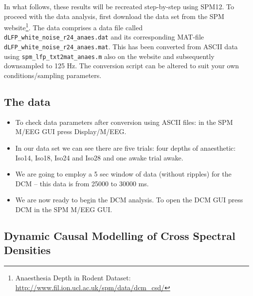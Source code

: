 In what follows, these results will be recreated step-by-step using SPM12.
To proceed with the data analysis, first download the data set from the SPM website\footnote{Anaesthesia Depth in Rodent Dataset: \url{http://www.fil.ion.ucl.ac.uk/spm/data/dcm_csd/}}. The data comprises a data file called \texttt{dLFP\_white\_noise\_r24\_anaes.dat} and its corresponding MAT-file \texttt{dLFP\_white\_noise\_r24\_anaes.mat}. This has been converted from ASCII data using \texttt{spm\_lfp\_txt2mat\_anaes.m} also on the website and subsequently downsampled to 125 Hz. The conversion script can be altered to suit your own conditions/sampling parameters.

\subsection{The data}

\begin{itemize}
\item To check data parameters after conversion using ASCII files: in the SPM M/EEG GUI press Display/M/EEG.
\item In our data set we can see there are five trials: four depths of anaesthetic: Iso14, Iso18, Iso24 and Iso28 and one awake trial awake.
\item We are going to employ a 5 sec window of data (without ripples) for the DCM – this data is from 25000 to 30000 ms.  
\item We are now ready to begin the DCM analysis. To open the DCM GUI press DCM in the SPM M/EEG GUI. 
\end{itemize}

\subsection{Dynamic Causal Modelling of Cross Spectral Densities}

